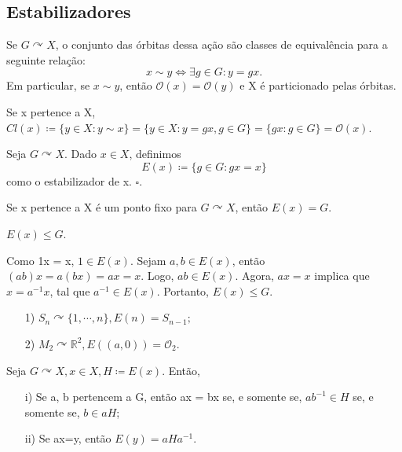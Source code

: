 \documentclass[Algebra/algebra_notes.tex]{subfiles}
\begin{document}
\subsection{Estabilizadores}
\begin{prop*}
	Se \(G \curvearrowright X\), o conjunto das órbitas dessa ação são classes de equivalência para a seguinte relação:
	\[
		x\sim y \Longleftrightarrow \exists g\in G: y = gx.
	\]
	Em particular, se \(x\sim y\), então \(\mathcal{O}(x) = \mathcal{O}(y)\) e X é particionado pelas órbitas.
\end{prop*}
\begin{proof*}
	Se x pertence a X, \(Cl(x)\coloneqq \{y\in X: y\sim x\} = \{y\in X: y=gx, g\in G\} = \{gx: g\in G\}= \mathcal{O}(x)\). \qedsymbol
\end{proof*}
\begin{def*}
	Seja \(G \curvearrowright X\). Dado \(x\in X\), definimos
	\[
		E(x)\coloneqq \{g\in G: gx = x\}
	\]
	como o estabilizador de x. \(\square\).
\end{def*}
\begin{example*}
	Se x pertence a X é um ponto fixo para \(G \curvearrowright X\), então \(E(x) = G.\)
\end{example*}
\begin{prop*}
	\(E(x)\leq G\).
\end{prop*}
\begin{proof*}
	Como 1x = x, \(1\in E(x)\). Sejam \(a, b\in E(x)\), então \((ab)x = a(bx) = ax = x\). Logo, \(ab\in E(x)\). Agora, \(ax = x \) implica que \( x = a^{-1}x \),
	tal que \(a^{-1}\in E(x)\). Portanto, \(E(x)\leq G.\) \qedsymbol
\end{proof*}
\begin{example*}
	\begin{itemize}
		\item[1)] \(S_{n} \curvearrowright \{1, \cdots, n\}, E(n) = S_{n-1};\)
		\item[2)] \(M_{2} \curvearrowright \mathbb{R}^{2}, E((a, 0)) = \mathcal{O}_{2}.\)
	\end{itemize}
\end{example*}
\begin{prop*}
	Seja \(G \curvearrowright X, x\in X, H\coloneqq E(x)\). Então,
	\begin{itemize}
		\item[i)] Se a, b pertencem a G, então ax = bx se, e somente se, \(ab^{-1}\in H\) se, e somente se, \(b\in aH\);
		\item[ii)] Se ax=y, então \(E(y) = aHa^{-1}\).
	\end{itemize}
\end{prop*}
\end{document}

